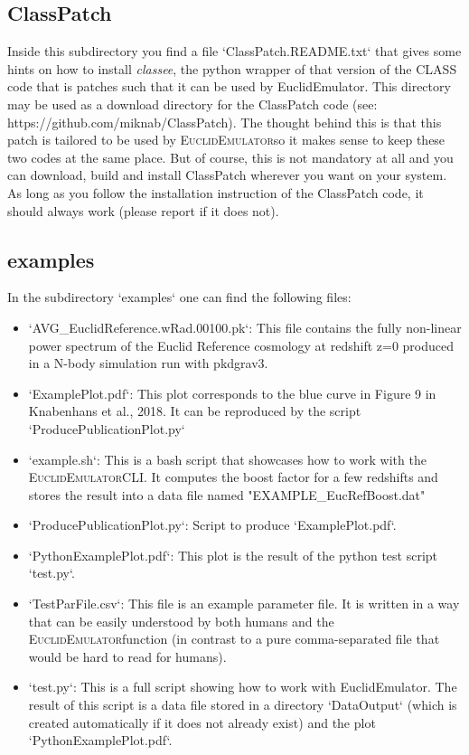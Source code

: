 \documentclass[american,11pt]{article}
\begin{document}
\subsection{ClassPatch} 
Inside this subdirectory you find a file `ClassPatch.README.txt` that gives some hints on how to install \textit{classee}, the python wrapper of that version of the CLASS code that is patches such that it can be used by EuclidEmulator. This directory may be used as a download directory for the ClassPatch code (see: https://github.com/miknab/ClassPatch). The thought behind this is that this patch is tailored to be used by \textsc{EuclidEmulator}so it makes sense to keep these two codes at the same place. But of course, this is not mandatory at all and you can download, build and install ClassPatch wherever you want on your system. As long as you follow the installation instruction of the ClassPatch code, it should always work (please report if it does not).

\subsection{examples}
In the subdirectory `examples` one can find the following files:

\begin{itemize}
\item `AVG\_EuclidReference.wRad.00100.pk`: This file contains the fully non-linear power spectrum of the Euclid Reference cosmology at redshift z=0 produced in a N-body simulation run with pkdgrav3.
\item `ExamplePlot.pdf`: This plot corresponds to the blue curve in Figure 9 in Knabenhans et al., 2018. It can be reproduced by the script `ProducePublicationPlot.py`
\item `example.sh`: This is a bash script that showcases how to work with the \textsc{EuclidEmulator}CLI. It computes the boost factor for a few redshifts and stores the result into a data file named "EXAMPLE\_EucRefBoost.dat"
\item `ProducePublicationPlot.py`: Script to produce `ExamplePlot.pdf`.
\item `PythonExamplePlot.pdf`: This plot is the result of the python test script `test.py`.
\item `TestParFile.csv`: This file is an example parameter file. It is written in a way that can be easily understood by both humans and the \textsc{EuclidEmulator}function (in contrast to a pure comma-separated file that would be hard to read for humans). 
\item `test.py`: This is a full script showing how to work with EuclidEmulator. The result of this script is a data file stored in a directory `DataOutput` (which is created automatically if it does not already exist) and the plot `PythonExamplePlot.pdf`.
\end{itemize}
\end{document}
